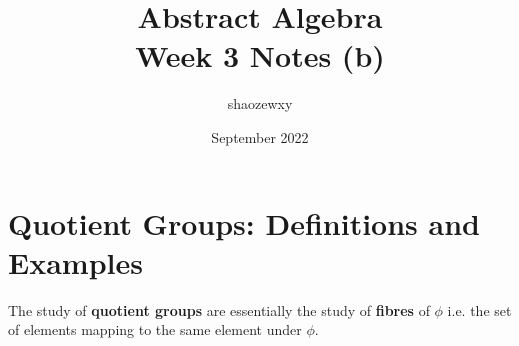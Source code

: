 \documentclass{article}
\title{Abstract Algebra\\
\large{Week 3 Notes (b)}}
\author{shaozewxy }
\date{September 2022}
\begin{document}
\maketitle
\section*{Quotient Groups: Definitions and Examples}
The study of \textbf{quotient groups} are essentially the study of \textbf{fibres} of $\phi$ i.e. the set of elements mapping to the same element under $\phi$.
\end{document}
